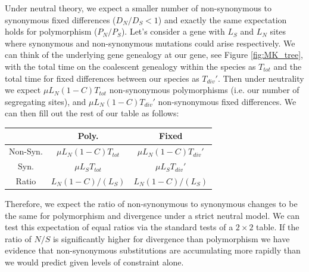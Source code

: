 Under neutral theory, we expect a smaller number of non-synonymous to
synonymous fixed differences ($D_N/D_S < 1$) and exactly the same
expectation holds for polymorphism ($P_N/P_S$). Let's consider a gene with $L_S$ and $L_N$ sites where synonymous and non-synonymous mutations could arise respectively.
We can think of the underlying gene genealogy at our gene, see Figure \ref{fig:MK_tree}, with the total time on the coalescent genealogy within the species as $T_{tot}$ and the total time for fixed differences between our species as $T_{div}'$. Then under neutrality we expect $ \mu L_N (1-C) T_{tot}$
non-synonymous polymorphisms (i.e. our number of segregating sites), and  $ \mu L_N (1-C) T_{div}'$ non-synonymous fixed differences.
We can then fill out the rest of our table as follows:


\begin{center}
\begin{tabular}{ccc}
 & Poly. & Fixed  \\
 \hline
Non-Syn. &    $\mu L_N (1-C) T_{tot}$  &   $\mu L_N (1-C)  T_{div}'$ \\
Syn. &    $\mu L_S T_{tot}$   &     $\mu L_S T_{div}'$  \\
Ratio & $ L_N(1-C)/( L_S)$  & $ L_N (1-C) / ( L_S)$
\end{tabular}
\end{center}
Therefore, we expect the ratio of non-synonymous to synonymous changes to be the same for polymorphism and divergence under a strict neutral model. We can test this expectation of equal ratios via the standard tests of a $2
\times 2$ table. If the ratio of $N/S$ is significantly higher for divergence than polymorphism we have evidence that non-synonymous substitutions are accumulating more rapidly than we would predict given levels of constraint alone.



